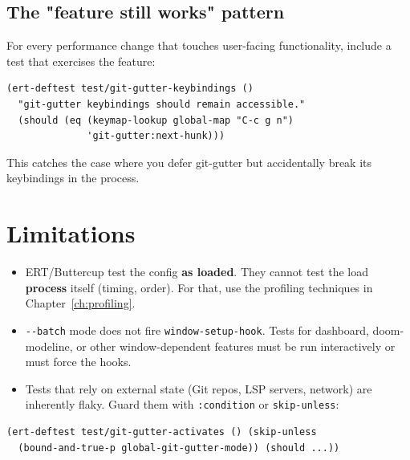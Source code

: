 \subsection{The "feature still works" pattern}\label{the-feature-still-works-pattern}

For every performance change that touches user-facing functionality, include a test that exercises the feature:

\begin{verbatim}
(ert-deftest test/git-gutter-keybindings ()
  "git-gutter keybindings should remain accessible."
  (should (eq (keymap-lookup global-map "C-c g n")
              'git-gutter:next-hunk)))
\end{verbatim}

This catches the case where you defer git-gutter but accidentally break its keybindings in the process.

\section{Limitations}\label{limitations}

\begin{itemize}
\item ERT/Buttercup test the config \textbf{as loaded}. They cannot test the load \textbf{process} itself (timing, order). For that, use the profiling techniques in Chapter~\ref{ch:profiling}.
\item \texttt{-\/-batch} mode does not fire \texttt{window-setup-hook}. Tests for dashboard, doom-modeline, or other window-dependent features must be run interactively or must force the hooks.
\item Tests that rely on external state (Git repos, LSP servers, network) are inherently flaky. Guard them with \texttt{:condition} or \texttt{skip-unless}:
\end{itemize}

\begin{verbatim}
(ert-deftest test/git-gutter-activates () (skip-unless
  (bound-and-true-p global-git-gutter-mode)) (should ...))
\end{verbatim}

